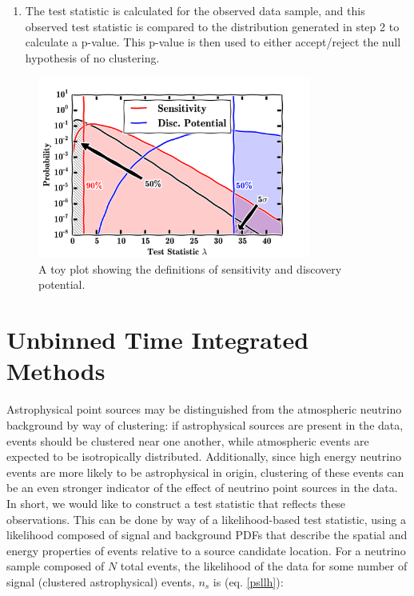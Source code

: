 \begin{enumerate}
    \item The test statistic is calculated for the observed data sample, and this observed test statistic is compared to the distribution generated in step 2 to calculate a p-value. This p-value is then used to either accept/reject the null hypothesis of no clustering.
\end{enumerate}

\begin{figure}[h]
\centering
\includegraphics[width=0.8\textwidth]{figs/sens_discpotential.png}
\caption{A toy plot showing the definitions of sensitivity and discovery potential. \cite{Reimann:2019zby}}
\label{fig:angres}
\end{figure}

\section{Unbinned Time Integrated Methods}
Astrophysical point sources may be distinguished from the atmospheric neutrino background by way of clustering: if astrophysical sources are present in the data, events should be clustered near one another, while atmospheric events are expected to be isotropically distributed. Additionally, since high energy neutrino events are more likely to be astrophysical in origin, clustering of these events can be an even stronger indicator of the effect of neutrino point sources in the data. In short, we would like to construct a test statistic that reflects these observations. This can be done by way of a likelihood-based test statistic, using a likelihood composed of signal and background PDFs that describe the spatial and energy properties of events relative to a source candidate location. For a neutrino sample composed of $N$ total events, the likelihood of the data for some number of signal (clustered astrophysical) events, $n_s$ is (eq. \ref{psllh})\cite{Braun_2010}:

